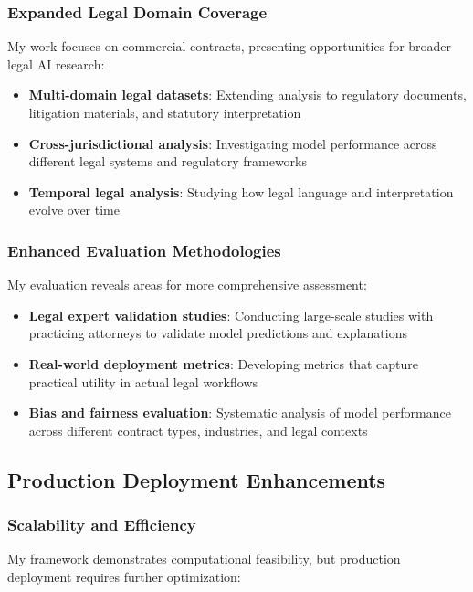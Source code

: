 \subsubsection{Expanded Legal Domain Coverage}
My work focuses on commercial contracts, presenting opportunities for broader legal AI research:

\begin{itemize}
\item \textbf{Multi-domain legal datasets}: Extending analysis to regulatory documents, litigation materials, and statutory interpretation
\item \textbf{Cross-jurisdictional analysis}: Investigating model performance across different legal systems and regulatory frameworks
\item \textbf{Temporal legal analysis}: Studying how legal language and interpretation evolve over time
\end{itemize}

\subsubsection{Enhanced Evaluation Methodologies}
My evaluation reveals areas for more comprehensive assessment:

\begin{itemize}
\item \textbf{Legal expert validation studies}: Conducting large-scale studies with practicing attorneys to validate model predictions and explanations
\item \textbf{Real-world deployment metrics}: Developing metrics that capture practical utility in actual legal workflows
\item \textbf{Bias and fairness evaluation}: Systematic analysis of model performance across different contract types, industries, and legal contexts
\end{itemize}

\subsection{Production Deployment Enhancements}
\label{subsec:deployment_enhancements}

\subsubsection{Scalability and Efficiency}
My framework demonstrates computational feasibility, but production deployment requires further optimization:

